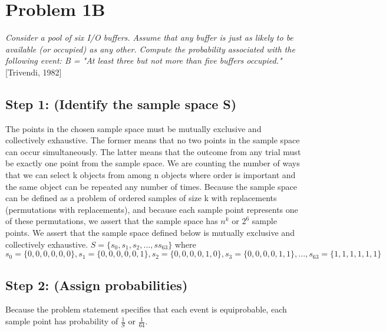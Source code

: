 \documentclass[a4paper,10pt]{article}
\title{}
\author{Mark Johnson \\
Loyola University Chicago}
\date {mjohnson4@luc.edu}
\begin{document}
\maketitle

\section{Problem 1B}
\emph{Consider a pool of six I/O buffers. Assume that any buffer is just as likely to be available (or occupied) as 
any other. Compute the probability associated with the following event: \newline
B = "At least three but not more than five buffers occupied."} [Trivendi, 1982]

\subsection{Step 1: (Identify the sample space S)}
The points in the chosen sample space must be mutually exclusive and collectively exhaustive. The former means that 
no two points in the sample space can occur simultaneously. The latter means that the outcome from any trial must be 
exactly one point from the sample space. We are counting the number of ways that we can select k objects from among n 
objects where order is important and the same object can be repeated any number of times. Because the sample space 
can be defined as a problem of ordered samples of size k with replacements (permutations with replacements), and 
because each sample point represents one of these permutations, we assert that the sample space has $ n^{k} $ or $ 2 
^{6} $ sample points. We assert that the sample space defined below is mutually exclusive and collectively 
exhaustive. \newline
$ S = \{s_{0}, s_{1}, s_{2},...,ss_{63}\} $ where \newline
$ s_{0} = \{0,0,0,0,0,0\}, s_{1} = \{0,0,0,0,0,1\}, s_{2} = \{0,0,0,0,1,0\}, s_{3} = \{0,0,0,0,1,1\},...,s_{63} = 
\{1,1,1,1,1,1\} $

\subsection{Step 2: (Assign probabilities)}
Because the problem statement specifies that each event is equiprobable, each sample point has probability of $ 
\frac{1}{S} $ 
or $ \frac{1}{64} $.
\end{document}
